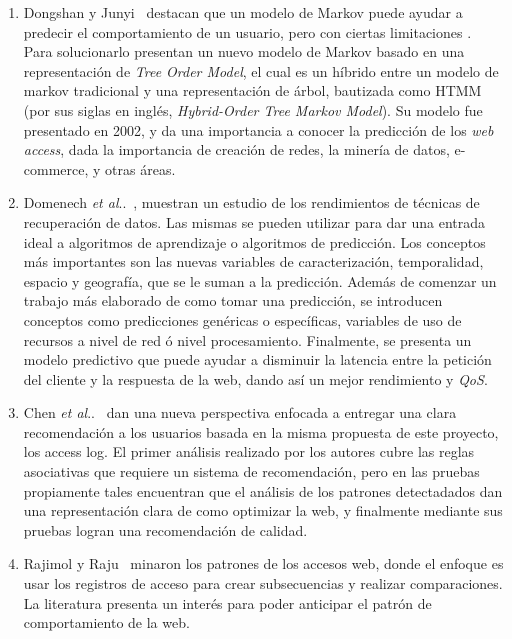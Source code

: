 \documentclass{udparticle}
\makeatletter
\DeclareRobustCommand\onedot{\futurelet\@let@token\@onedot}
\newcommand\@onedot{\ifx\@let@token.\else.\null\fi\xspace}
\newcommand\etal{\emph{et al}\onedot}
\makeatother
\begin{document}
\begin{enumerate}
  \item Dongshan y Junyi~\cite{Dongshan2002} destacan que un modelo de Markov puede ayudar a predecir el comportamiento de un usuario, pero con ciertas limitaciones .  Para solucionarlo presentan un nuevo modelo de Markov basado en una representación de \emph{Tree Order Model}, el cual es un híbrido entre un modelo de markov tradicional y una representación de árbol, bautizada como HTMM (por sus siglas en inglés, \emph{Hybrid-Order Tree Markov Model}).
  Su modelo fue presentado en 2002, y da una importancia a conocer la predicción de los \emph{web access}, dada la importancia de creación de redes, la minería de datos, e-commerce, y otras áreas.

  \item Domenech \etal~\cite{Domenech2006}, muestran un estudio de los rendimientos de técnicas de recuperación de datos.
  Las mismas se pueden utilizar para dar una entrada ideal a algoritmos de aprendizaje o algoritmos de predicción. 
  Los conceptos más importantes son las nuevas variables de caracterización, temporalidad, espacio y geografía, que se le suman a la predicción. 
  Además de comenzar un trabajo más elaborado de como tomar una predicción, se introducen conceptos como predicciones genéricas o específicas, variables de uso de recursos a nivel de red ó nivel procesamiento.
  Finalmente, se presenta un modelo predictivo que puede ayudar a disminuir la latencia entre la petición del cliente y la respuesta de la web, dando así un mejor rendimiento y \emph{QoS}.



  \item Chen \etal~\cite{Chen2011} dan una nueva perspectiva enfocada a entregar una clara recomendación a los usuarios basada en la misma propuesta de este proyecto, los access log.
  El primer análisis realizado por los autores cubre las reglas asociativas que requiere un sistema de recomendación, pero en las pruebas propiamente tales encuentran que el análisis de los patrones detectadados dan una representación clara de como optimizar la web, y finalmente mediante sus pruebas logran una recomendación de calidad.

  \item Rajimol y Raju~\cite{Rajimol2012} minaron los patrones de los accesos web, donde el enfoque es usar los registros de acceso para crear subsecuencias y realizar comparaciones.
  La literatura presenta un interés para poder anticipar el patrón de comportamiento de la web.


\end{enumerate}
\end{document}

